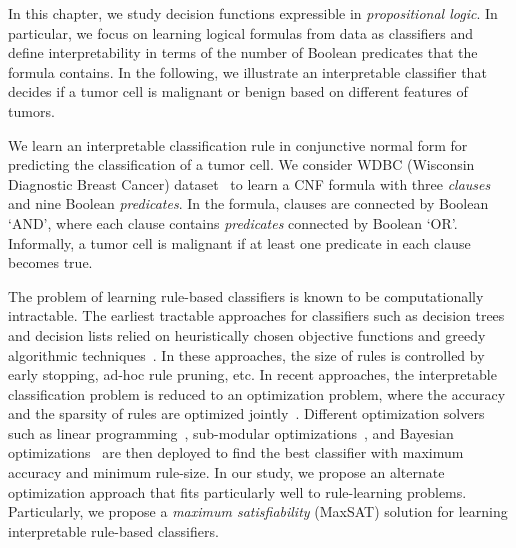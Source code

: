In this chapter, we study decision functions expressible in \emph{propositional logic}. In particular, we focus on learning logical formulas from data as classifiers and define interpretability in terms of the number of Boolean predicates that the formula contains. In the following, we illustrate an interpretable classifier that decides if a tumor cell is malignant or benign based on different features of tumors.



\begin{example}
	\normalfont
	We learn an interpretable classification rule in conjunctive normal form for predicting the classification of a tumor cell. We consider WDBC (Wisconsin Diagnostic Breast Cancer) dataset~\cite{agarap2018breast} to learn a CNF formula with three \emph{clauses} and nine Boolean \emph{predicates}. In the formula, clauses are connected by Boolean `AND', where each clause contains \emph{predicates} connected by Boolean `OR'. Informally, a tumor cell is malignant if at least one predicate in each clause becomes true.
\end{example}



The problem of learning rule-based classifiers is known to be computationally intractable. The earliest tractable approaches for classifiers such as decision trees and decision lists relied on heuristically chosen objective functions and greedy algorithmic techniques~\cite{ClarkN1989,CohenS1999,quinlan2014}. In these approaches, the size of rules is controlled by early stopping,  ad-hoc rule pruning, etc. In recent approaches, the interpretable classification problem is reduced to an optimization problem, where the accuracy and the sparsity of rules are optimized jointly~\cite{lakkaraju2016interpretable,narodytska2018learning}. Different optimization solvers such as linear programming~\cite{malioutov2013exact}, sub-modular optimizations~\cite{lakkaraju2016interpretable}, and Bayesian optimizations~\cite{letham2015interpretable} are then deployed to find the best classifier with maximum accuracy and minimum rule-size. In our study, we propose an alternate optimization approach that fits particularly well to rule-learning problems. Particularly,  we propose a \textit{maximum satisfiability} (MaxSAT)  solution for learning interpretable rule-based classifiers. 

